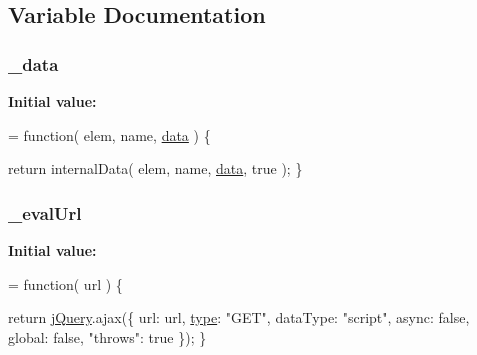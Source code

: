 \subsection{Variable Documentation}
\hypertarget{jquery-1_810_82-vsdoc_8js_a01a70510ea17cfcb22c0ca5e079baf8c}{
\subsubsection[{\-\_\-data}]{ \-\_\-data}}\label{jquery-1_810_82-vsdoc_8js_a01a70510ea17cfcb22c0ca5e079baf8c}
{\bfseries Initial value\-:}
\begin{DoxyCode}
= \textcolor{keyword}{function}( elem, name, \hyperlink{jquery-1_810_82-vsdoc_8js_a609407b3456fdc3c5671a9fc4a226ff7}{data} ) \{

        \textcolor{keywordflow}{return} internalData( elem, name, \hyperlink{jquery-1_810_82-vsdoc_8js_a609407b3456fdc3c5671a9fc4a226ff7}{data}, \textcolor{keyword}{true} );
    \}
\end{DoxyCode}
\hypertarget{jquery-1_810_82-vsdoc_8js_a3df854ea600b5f5f02a872ad0feccfc2}{
\subsubsection[{\-\_\-eval\-Url}]{ \-\_\-eval\-Url}}\label{jquery-1_810_82-vsdoc_8js_a3df854ea600b5f5f02a872ad0feccfc2}
{\bfseries Initial value\-:}
\begin{DoxyCode}
= \textcolor{keyword}{function}( url ) \{

        \textcolor{keywordflow}{return} \hyperlink{jquery-1_810_82-vsdoc_8js_add5237586d970a38a81f990e8eb28c6c}{jQuery}.ajax(\{
            url: url,
            \hyperlink{jquery-1_810_82-vsdoc_8js_a3940565e83a9bfd10d95ffd27536da91}{type}: \textcolor{stringliteral}{"GET"},
            dataType: \textcolor{stringliteral}{"script"},
            async: \textcolor{keyword}{false},
            global: \textcolor{keyword}{false},
            \textcolor{stringliteral}{"throws"}: \textcolor{keyword}{true}
        \});
    \}
\end{DoxyCode}
